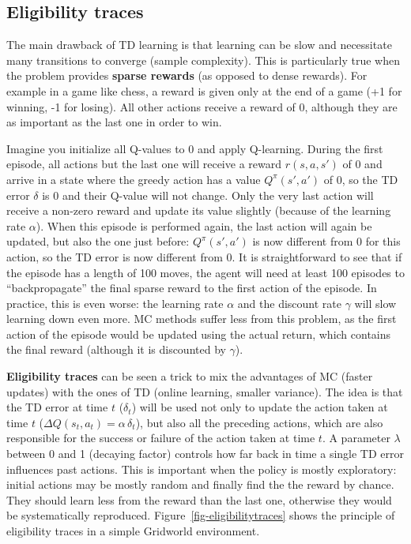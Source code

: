 \documentclass[
  letterpaper,
  DIV=11,
  numbers=noendperiod]{scrreprt}
\begin{document}
\hypertarget{eligibility-traces}{%
\subsection{Eligibility traces}\label{eligibility-traces}}

The main drawback of TD learning is that learning can be slow and
necessitate many transitions to converge (sample complexity). This is
particularly true when the problem provides \textbf{sparse rewards} (as
opposed to dense rewards). For example in a game like chess, a reward is
given only at the end of a game (+1 for winning, -1 for losing). All
other actions receive a reward of 0, although they are as important as
the last one in order to win.

Imagine you initialize all Q-values to 0 and apply Q-learning. During
the first episode, all actions but the last one will receive a reward
\(r(s, a, s')\) of 0 and arrive in a state where the greedy action has a
value \(Q^\pi(s', a')\) of 0, so the TD error \(\delta\) is 0 and their
Q-value will not change. Only the very last action will receive a
non-zero reward and update its value slightly (because of the learning
rate \(\alpha\)). When this episode is performed again, the last action
will again be updated, but also the one just before: \(Q^\pi(s', a')\)
is now different from 0 for this action, so the TD error is now
different from 0. It is straightforward to see that if the episode has a
length of 100 moves, the agent will need at least 100 episodes to
``backpropagate'' the final sparse reward to the first action of the
episode. In practice, this is even worse: the learning rate \(\alpha\)
and the discount rate \(\gamma\) will slow learning down even more. MC
methods suffer less from this problem, as the first action of the
episode would be updated using the actual return, which contains the
final reward (although it is discounted by \(\gamma\)).

\textbf{Eligibility traces} can be seen a trick to mix the advantages of
MC (faster updates) with the ones of TD (online learning, smaller
variance). The idea is that the TD error at time \(t\) (\(\delta_t\))
will be used not only to update the action taken at time \(t\)
(\(\Delta Q(s_t, a_t) = \alpha \, \delta_t\)), but also all the
preceding actions, which are also responsible for the success or failure
of the action taken at time \(t\). A parameter \(\lambda\) between 0 and
1 (decaying factor) controls how far back in time a single TD error
influences past actions. This is important when the policy is mostly
exploratory: initial actions may be mostly random and finally find the
the reward by chance. They should learn less from the reward than the
last one, otherwise they would be systematically reproduced.
Figure~\ref{fig-eligibilitytraces} shows the principle of eligibility
traces in a simple Gridworld environment.
\end{document}

